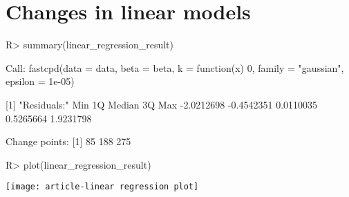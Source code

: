 \documentclass[article]{jss}
\begin{document}
\section{Changes in linear models} \label{sec:linear model}

\begin{Schunk}
\begin{Sinput}
R> summary(linear_regression_result)
\end{Sinput}
\begin{Soutput}
Call:
fastcpd(data = data, beta = beta, k = function(x) 0, family = "gaussian", 
    epsilon = 1e-05)

[1] "Residuals:"
       Min         1Q     Median         3Q        Max 
-2.0212698 -0.4542351  0.0110035  0.5265664  1.9231798 

Change points:
[1]  85 188 275
\end{Soutput}
\begin{Sinput}
R> plot(linear_regression_result)
\end{Sinput}
\end{Schunk}
\texttt{[image: article-linear regression plot]}
\end{document}
